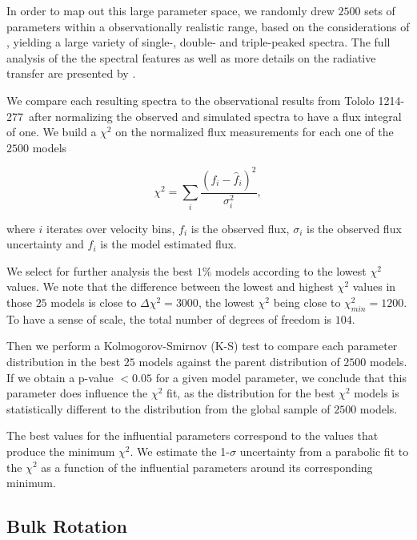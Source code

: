 \documentclass[a4,useAMS,usenatbib,usegraphicx]{mn2e}
\newcommand{\tol}{Tololo 1214-277}
\begin{document}
In order to map out this large parameter space, we randomly drew
$2500$ sets of parameters within a observationally realistic range,
based on the considerations of \citet{Laursen2013ApJ...766..124L}, 
yielding a large variety of single-, double- and triple-peaked
spectra. 
The full analysis of the the spectral features as well as
more details on the radiative transfer are presented by
\citet{Gronke2016}.    

We compare each resulting spectra to the observational results from
\tol\ after normalizing the observed and simulated spectra to have a 
flux integral of one.
We build a $\chi^2$ on the normalized flux measurements for each one
of the $2500$ models

\begin{equation}
\chi^2 = \sum_{i} \frac{({f}_i - \hat{f}_i)^2}{\sigma_i^2}, 
\label{eq:chi2}
\end{equation}

where $i$ iterates over velocity bins, $f_{i}$ is the observed flux,
$\sigma_i$ is the observed flux uncertainty and $\hat{f}_i$ is the
model estimated flux.
 
We select for further analysis the best $1\%$ models according to the
lowest $\chi^2$ values.
We note that the difference between the lowest and highest $\chi^2$ values in
those $25$ models is close to $\Delta\chi^2 = 3000$, the lowest
$\chi^2$ being close to $\chi^2_{min}=1200$. To have a sense of scale,
the total number of degrees of freedom is $104$. 

Then we perform a Kolmogorov-Smirnov (K-S) test to compare each parameter
distribution in the best $25$ models against the parent distribution
of $2500$ models. 
If we obtain a p-value $<0.05$ for a given model parameter, we conclude that
this parameter does influence the $\chi^2$ fit, as the distribution for
the best $\chi^2$ models is statistically different to the
distribution from the global sample of $2500$ models.  

The best values for the influential parameters correspond to
the values that produce the minimum
$\chi^2$.
We estimate the 1-$\sigma$ uncertainty from a parabolic fit to the
$\chi^2$ as a function of the influential parameters around its
corresponding minimum.   



\subsection{Bulk Rotation}
\end{document}
